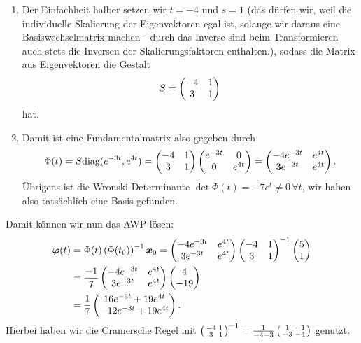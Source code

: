\begin{Beispiel}
\begin{enumerate}
    \item Der Einfachheit halber setzen wir $t=-4$ und $s=1$ (das dürfen wir, weil die individuelle Skalierung der Eigenvektoren egal ist, solange wir daraus eine Basiswechselmatrix machen - durch das Inverse sind beim Transformieren auch stets die Inversen der Skalierungsfaktoren enthalten.), sodass die Matrix aus Eigenvektoren die Gestalt
    \begin{equation*}
        S=\begin{pmatrix}-4&1\\3&1\end{pmatrix}
    \end{equation*}
    hat.
    \item Damit ist eine Fundamentalmatrix also gegeben durch
    \begin{equation*}
        \Phi(t)=S\text{diag}(e^{-3t},e^{4t})=\begin{pmatrix}-4&1\\3&1\end{pmatrix}\begin{pmatrix}e^{-3t}&0\\0&e^{4t}\end{pmatrix}=\begin{pmatrix}-4e^{-3t}&e^{4t}\\3e^{-3t}&e^{4t}\end{pmatrix}.
    \end{equation*}
    Übrigens ist die Wronski-Determinante $\det\Phi(t)=-7e^{t}\neq 0\,\forall t$, wir haben also tatsächlich eine Basis gefunden.
\end{enumerate}
Damit können wir nun das AWP lösen:
\begin{align*}
    {{\text{\boldmath${\varphi}$}}}(t)&=\Phi(t)\left({\Phi(t_0)}\right)^{-1}{{\text{\boldmath${x}$}}}_0=\begin{pmatrix}-4e^{-3t}&e^{4t}\\3e^{-3t}&e^{4t}\end{pmatrix}\begin{pmatrix}-4&1\\3&1\end{pmatrix}^{-1}\begin{pmatrix}5\\1\end{pmatrix}\\
    &=\frac{-1}{7}\begin{pmatrix}-4e^{-3t}&e^{4t}\\3e^{-3t}&e^{4t}\end{pmatrix}\begin{pmatrix}4\\-19\end{pmatrix}\\
    &=\frac{1}{7}\begin{pmatrix}16e^{-3t}+19e^{4t}\\-12e^{-3t}+19e^{4t}\end{pmatrix}.
\end{align*}
Hierbei haben wir die Cramersche Regel mit $\left(\begin{smallmatrix}-4&1\\3&1\end{smallmatrix}\right)^{-1}=\frac{1}{-4-3}\left(\begin{smallmatrix}1&-1\\-3&-4\end{smallmatrix}\right)$ genutzt.
\end{Beispiel}

